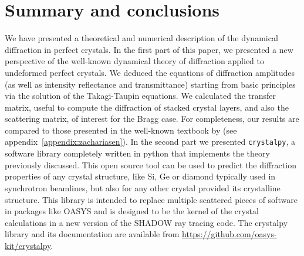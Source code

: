 \documentclass[preprint]{iucr}              %
\newcommand{\todo}[1]{{\color{red}[TODO: "#1'']}}
\begin{document}


%
\section{Summary and conclusions}
\label{sec:summary}

We have presented a theoretical and numerical description of the dynamical diffraction in perfect crystals. In the first part of this paper, we presented a new perspective of the well-known dynamical theory of diffraction applied to undeformed perfect crystals. We deduced the equations of diffraction amplitudes (as well as intensity reflectance and transmittance) starting from basic principles via the solution of the Takagi-Taupin equations. We calculated the transfer matrix, useful to compute the diffraction of stacked crystal layers, and also the scattering matrix, of interest for the Bragg case. For completeness, our results are compared to those presented in the well-known textbook by \cite{ZachariasenBook} (see appendix~\ref{appendix:zachariasen}).
In the second part we presented {\tt crystalpy}, a software library completely written in python that implements the theory previously discussed. This open source tool can be used to predict the diffraction properties of any crystal structure, like Si, Ge or diamond typically used in synchrotron beamlines, but also for any other crystal provided its crystalline structure. This library is intended to replace multiple scattered pieces of software in packages like OASYS \cite{codeOASYS} and is designed to be the kernel of the crystal calculations in a new version of the SHADOW \cite{codeSHADOW} ray tracing code. The crystalpy library and its documentation are available from \url{https://github.com/oasys-kit/crystalpy}. 
\end{document}
